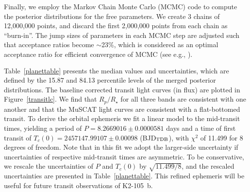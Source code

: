 \documentclass[]{pasj01}
\begin{document}
Finally, we employ the Markov Chain Monte Carlo (MCMC) code
\citep{2013ApJ...773..144N,2016ApJ...819...27F}
to compute the posterior distributions for the free parameters.
We create 3 chains of 12,000,000 points,
and discard the first 2,000,000 points from each chain as ``burn-in''.
The jump sizes of parameters in each MCMC step are adjusted
such that acceptance ratios become $\sim$23\%,
which is considered as an optimal acceptance ratio for efficient convergence of MCMC
(see e.g., \cite{2005AJ....129.1706F}).

Table~\ref{planettable} presents the median values and uncertainties, which are defined
by the 15.87 and 84.13 percentile levels of the merged posterior distributions.
The baseline corrected transit light curves (in flux) are plotted in Figure~\ref{transitlc}.
We find that $R_p/R_\star$ for all three bands are consistent with one another
and that the MuSCAT light curves are consistent with a flat-bottomed transit.
To derive the orbital ephemeris we fit a linear model to the mid-transit times, 
yielding a period of $P=8.2669016 \pm 0.0000581$ days
and a time of first transit of $T_c (0) = 2457147.99107 \pm 0.00098$ (BJD$_{\rm TDB}$),
with $\chi^2$ of 11.499 for 8 degrees of freedom.
Note that in this fit we adopt the larger-side uncertainty if uncertainties of
respective mid-transit times are asymmetric.
To be conservative, we rescale the uncertainties of $P$ and $T_c (0)$ by $\sqrt{11.499/8}$,
and the rescaled uncertainties are presented in Table~\ref{planettable}.
This refined ephemeris will be useful for future transit observations of K2-105~b.
\end{document}
